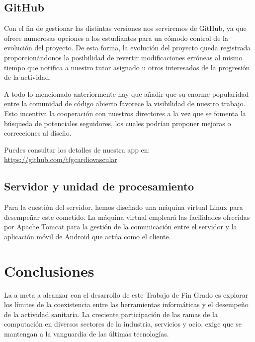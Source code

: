 \documentclass[11pt,spanish,
		listoftables,listoffigures]
		{tfgplantilla}
\begin{document}
\section {GitHub}

Con el fin de gestionar las distintas versiones nos serviremos de GitHub, ya que ofrece numerosas opciones a los estudiantes para un cómodo control de la evolución del proyecto. De esta forma, la evolución del proyecto queda registrada proporcionándonos la posibilidad de revertir modificaciones erróneas al mismo tiempo que notifica a nuestro tutor asignado u otros interesados de la progresión de la actividad. 

A todo lo mencionado anteriormente hay que añadir que su enorme popularidad entre la comunidad de código abierto favorece la visibilidad de nuestro trabajo. Esto incentiva la cooperación con nuestros directores a la vez que se fomenta la búsqueda de potenciales seguidores, los cuales podrían proponer mejoras o correcciones al diseño.

\noindent Puedes consultar los detalles de nuestra app en: \url{https://github.com/tfgcardiovascular}

\section {Servidor y unidad de procesamiento}

Para la cuestión del servidor, hemos diseñado una máquina virtual Linux para desempeñar este cometido. La máquina virtual empleará las facilidades ofrecidas por Apache Tomcat para la gestión de la comunicación entre el servidor y la aplicación móvil de Android que actúa como el cliente.



\chapter{Conclusiones}

La a meta a alcanzar con el desarrollo de este Trabajo de Fin Grado es explorar los límites de la coexistencia entre las herramientas informáticas y el desempeño de la actividad sanitaria. La creciente participación de las ramas de la computación en diversos sectores de la industria, servicios y ocio, exige que se mantengan a la vanguardia de las últimas tecnologías.
\end{document}
